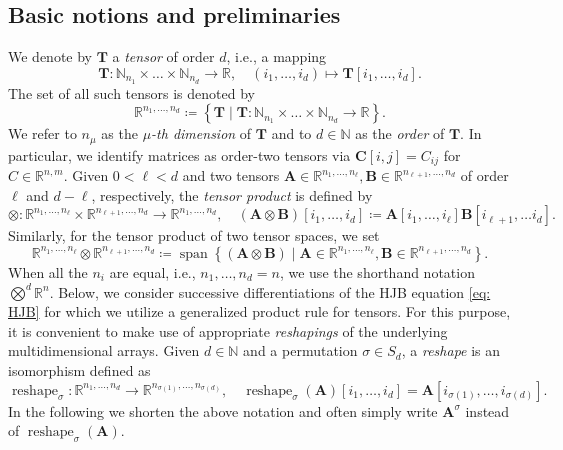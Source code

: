 \documentclass[11pt,reqno]{amsart}
\numberwithin{equation}{section}
\theoremstyle{plain}
\newcommand{\R}{\mathbb{R}}
\newcommand{\N}{\mathbb{N}}
\DeclareMathOperator{\vspan}{span}
\DeclareMathOperator{\reshape}{reshape}
\begin{document}
\subsection{Basic notions and preliminaries}
\label{subsec:tensor_prelim}

We denote by $\mathbf{T}$ a \emph{tensor} of order $d$, i.e., a mapping 
\begin{equation}\label{EQ:Tensor}
    \mathbf{T} \colon \N_{n_1}\times \dots \times \N_{n_d} \to \R,\quad (i_1,\dots,i_d)\mapsto \mathbf{T}[i_1,\dots,i_d].
  \end{equation}
  The set of all such tensors is denoted by  
  \[
  \R^{n_1,\dots, n_d}\coloneqq \left\{\mathbf{T}\mid \mathbf{T}\colon\N_{n_1}\times \dots \times \N_{n_d} \to \R \right\}.
  \]
We refer to $n_\mu$ as the \emph{$\mu$-th dimension} of $\mathbf{T}$ and to $d\in\N$ as the \emph{order} of $\mathbf{T}$. 
In particular, we identify matrices as order-two tensors via $\mathbf{C}[i,j] = C_{ij}$ for $C\in\R^{n,m}$.
Given $0<\ell<d$ and two tensors $\mathbf{A}\in \R^{n_1,\dots,n_\ell},\mathbf{B}\in \R^{n_{\ell+1},\dots,n_d}$ of order $\ell$ and $d-\ell$, respectively, the \emph{tensor product} is defined by
\[
    \otimes\colon  \R^{n_1,\dots,n_\ell}\times\R^{n_{\ell+1},\dots,n_d}\to \R^{n_1,\dots,n_d}, \quad \left(\mathbf{A}\otimes \mathbf{B}\right)[i_1,\dots,i_d] \coloneqq \mathbf{A}[i_1,\dots,i_\ell]\mathbf{B}[i_{\ell+1},\dots i_d].
  \]
Similarly, for the tensor product of two tensor spaces, we set
\[
    \R^{n_1,\dots,n_\ell}\otimes\R^{n_{\ell+1},\dots,n_d} \coloneqq \vspan \left\{ \left(\mathbf{A}\otimes \mathbf{B}\right)\mid \mathbf{A}\in \R^{n_1,\dots,n_\ell}, \mathbf{B}\in \R^{n_{\ell+1},\dots,n_d}  \right\}.
  \]
When all the $n_i$ are equal, i.e., $n_1,\dots,n_d=n$, we use the shorthand notation $\bigotimes^d\R^n.$
Below, we consider successive differentiations of the HJB equation \eqref{eq: HJB} for which we utilize a generalized product rule for tensors. For this purpose, it is convenient to make use of appropriate \emph{reshapings} of the underlying multidimensional arrays. Given $d\in\N$ and a permutation $\sigma\in S_d$, a \emph{reshape} is an isomorphism defined as
  \[
    \reshape_\sigma\colon \R^{n_1,\dots,n_d} \to \R^{n_{\sigma(1)},\dots,n_{\sigma(d)}}, \quad \reshape_\sigma(\mathbf{A})[i_1,\dots,i_d] = \mathbf{A}[i_{\sigma(1)},\dots,i_{\sigma(d)}].
  \]
In the following we shorten the above notation and often simply write $\mathbf{A}^\sigma$ instead of $\reshape_\sigma(\mathbf{A})$.
\end{document}
